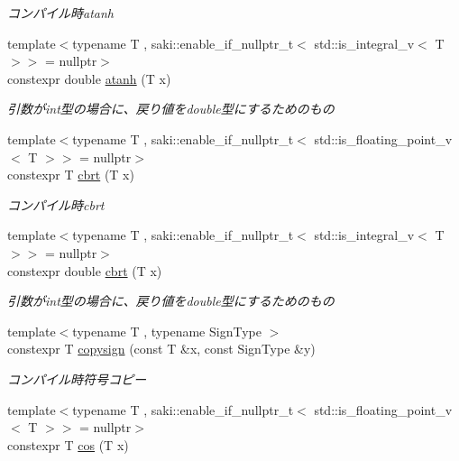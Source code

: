 \begin{DoxyCompactItemize}
\begin{DoxyCompactList}\small\item\em コンパイル時atanh \end{DoxyCompactList}\item 
{\footnotesize template$<$typename T , saki\+::enable\+\_\+if\+\_\+nullptr\+\_\+t$<$ std\+::is\+\_\+integral\+\_\+v$<$ T $>$$>$  = nullptr$>$ }\\constexpr double \mbox{\hyperlink{namespacesaki_a1b7d87f99b61600e1201b10de467200f}{atanh}} (T x)
\begin{DoxyCompactList}\small\item\em 引数がint型の場合に、戻り値をdouble型にするためのもの \end{DoxyCompactList}\item 
{\footnotesize template$<$typename T , saki\+::enable\+\_\+if\+\_\+nullptr\+\_\+t$<$ std\+::is\+\_\+floating\+\_\+point\+\_\+v$<$ T $>$$>$  = nullptr$>$ }\\constexpr T \mbox{\hyperlink{namespacesaki_a8836c929b71a61cf0151d3b76eb7af15}{cbrt}} (T x)
\begin{DoxyCompactList}\small\item\em コンパイル時cbrt \end{DoxyCompactList}\item 
{\footnotesize template$<$typename T , saki\+::enable\+\_\+if\+\_\+nullptr\+\_\+t$<$ std\+::is\+\_\+integral\+\_\+v$<$ T $>$$>$  = nullptr$>$ }\\constexpr double \mbox{\hyperlink{namespacesaki_a5a3d1ab0508dcff1fb2e17a4ef8a855d}{cbrt}} (T x)
\begin{DoxyCompactList}\small\item\em 引数がint型の場合に、戻り値をdouble型にするためのもの \end{DoxyCompactList}\item 
{\footnotesize template$<$typename T , typename Sign\+Type $>$ }\\constexpr T \mbox{\hyperlink{namespacesaki_a8bab6303ac2144b883080f04ebe26a0e}{copysign}} (const T \&x, const Sign\+Type \&y)
\begin{DoxyCompactList}\small\item\em コンパイル時符号コピー \end{DoxyCompactList}\item 
{\footnotesize template$<$typename T , saki\+::enable\+\_\+if\+\_\+nullptr\+\_\+t$<$ std\+::is\+\_\+floating\+\_\+point\+\_\+v$<$ T $>$$>$  = nullptr$>$ }\\constexpr T \mbox{\hyperlink{namespacesaki_a82551963a8cab889ca6f76ed346d6f4f}{cos}} (T x)

\end{DoxyCompactItemize}
